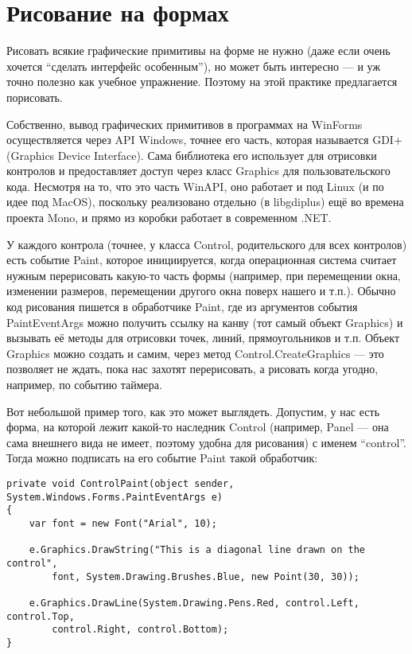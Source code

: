 \documentclass{../../text-style}
\begin{document}
\maketitle
\thispagestyle{empty}

\section{Рисование на формах}

Рисовать всякие графические примитивы на форме не нужно (даже если очень хочется \enquote{сделать интерфейс особенным}), но может быть интересно --- и уж точно полезно как учебное упражнение.
Поэтому на этой практике предлагается порисовать.

Собственно, вывод графических примитивов в программах на WinForms осуществляется через API Windows, точнее его часть, которая называется GDI+ (Graphics Device Interface).
Сама библиотека его использует для отрисовки контролов и предоставляет доступ через класс Graphics для пользовательского кода.
Несмотря на то, что это часть WinAPI, оно работает и под Linux (и по идее под MacOS), поскольку реализовано отдельно (в libgdiplus) ещё во времена проекта Mono, и прямо из коробки работает в современном .NET.

У каждого контрола (точнее, у класса Control, родительского для всех контролов) есть событие Paint, которое инициируется, когда операционная система считает нужным перерисовать какую-то часть формы (например, при перемещении окна, изменении размеров, перемещении другого окна поверх нашего и т.п.).
Обычно код рисования пишется в обработчике Paint, где из аргументов события PaintEventArgs можно получить ссылку на канву (тот самый объект Graphics) и вызывать её методы для отрисовки точек, линий, прямоугольников и т.п.
Объект Graphics можно создать и самим, через метод Control.CreateGraphics --- это позволяет не ждать, пока нас захотят перерисовать, а рисовать когда угодно, например, по событию таймера.

Вот небольшой пример того, как это может выглядеть.
Допустим, у нас есть форма, на которой лежит какой-то наследник Control (например, Panel --- она сама внешнего вида не имеет, поэтому удобна для рисования) с именем \enquote{control}.
Тогда можно подписать на его событие Paint такой обработчик:

\begin{verbatim}
private void ControlPaint(object sender, System.Windows.Forms.PaintEventArgs e)
{
    var font = new Font("Arial", 10);

    e.Graphics.DrawString("This is a diagonal line drawn on the control",
        font, System.Drawing.Brushes.Blue, new Point(30, 30));

    e.Graphics.DrawLine(System.Drawing.Pens.Red, control.Left, control.Top,
        control.Right, control.Bottom);
}
\end{verbatim}
\end{document}
